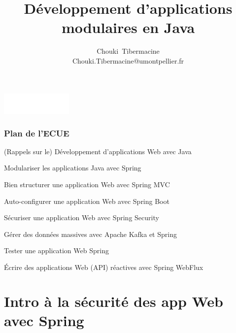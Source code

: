 \documentclass{beamer}
\title[]{\Large{Développement d'applications modulaires en Java}}
\author[C. Tibermacine]{\large{Chouki~Tibermacine}\\
\small{Chouki.Tibermacine@umontpellier.fr}}
\date{\tiny{}}
\begin{document}
\begin{frame}
\titlepage
\begin{flushright}
\includegraphics[width=3.5cm]{figs/polytech.png}
\end{flushright}
\end{frame}

\begin{frame}
	\frametitle{Plan de l'ECUE}
	\begin{enumerate}
		{\color{gray} \item (Rappels sur le) Développement d'applications Web avec Java
			\item Modulariser les applications Java avec Spring
		\item Bien structurer une application Web avec Spring MVC
		
			\item Auto-configurer une application Web avec Spring Boot}
			\item Sécuriser une application Web avec Spring Security
		{\color{gray}				
			\item Gérer des données massives avec Apache Kafka et Spring
			\item Tester une application Web Spring
			\item Écrire des applications Web (API) réactives avec Spring WebFlux}
	\end{enumerate}
\end{frame}



\section{Intro à la sécurité des app Web avec Spring}
\end{document}
